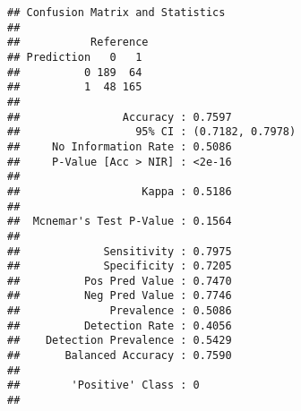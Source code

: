 \documentclass[
]{article}
\newenvironment{Shaded}{\begin{snugshade}}{\end{snugshade}}
\newcommand{\AttributeTok}[1]{\textcolor[rgb]{0.13,0.29,0.53}{#1}}
\newcommand{\DecValTok}[1]{\textcolor[rgb]{0.00,0.00,0.81}{#1}}
\newcommand{\FloatTok}[1]{\textcolor[rgb]{0.00,0.00,0.81}{#1}}
\newcommand{\FunctionTok}[1]{\textcolor[rgb]{0.13,0.29,0.53}{\textbf{#1}}}
\newcommand{\NormalTok}[1]{#1}
\newcommand{\OtherTok}[1]{\textcolor[rgb]{0.56,0.35,0.01}{#1}}
\newcommand{\SpecialCharTok}[1]{\textcolor[rgb]{0.81,0.36,0.00}{\textbf{#1}}}
\newcommand{\StringTok}[1]{\textcolor[rgb]{0.31,0.60,0.02}{#1}}
\begin{document}
\begin{Shaded}
\end{Shaded}

\begin{verbatim}
## Confusion Matrix and Statistics
## 
##           Reference
## Prediction   0   1
##          0 189  64
##          1  48 165
##                                           
##                Accuracy : 0.7597          
##                  95% CI : (0.7182, 0.7978)
##     No Information Rate : 0.5086          
##     P-Value [Acc > NIR] : <2e-16          
##                                           
##                   Kappa : 0.5186          
##                                           
##  Mcnemar's Test P-Value : 0.1564          
##                                           
##             Sensitivity : 0.7975          
##             Specificity : 0.7205          
##          Pos Pred Value : 0.7470          
##          Neg Pred Value : 0.7746          
##              Prevalence : 0.5086          
##          Detection Rate : 0.4056          
##    Detection Prevalence : 0.5429          
##       Balanced Accuracy : 0.7590          
##                                           
##        'Positive' Class : 0               
## 
\end{verbatim}
\end{document}
